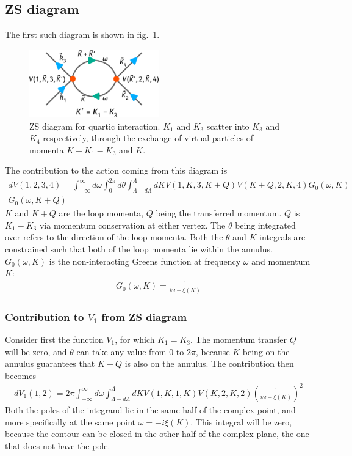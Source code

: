 \documentclass{article}
\begin{document}
\subsection{ZS diagram}
The first such diagram is shown in fig.~\ref{loop11}.
\begin{figure}[!htpb]
\centering
\includegraphics[width=0.5\textwidth]{./figures/term3.pdf}
\caption{ZS diagram for quartic interaction. \(K_1\) and \(K_3\) scatter into \(K_3\) and \(K_4\) respectively, through the exchange of virtual particles of momenta \(K + K_1 - K_3\) and \(K\).}
\label{loop11}
\end{figure}
The contribution to the action coming from this diagram is
\begin{equation}\begin{aligned}
	dV(1,2,3,4) = \int_{-\infty}^\infty d\omega  \int_0^{2\pi} d\theta \int_{\Lambda - d\Lambda}^\Lambda dK V(1,K,3,K+Q) V(K+Q, 2, K, 4) G_0(\omega, K)\\
	G_0(\omega, K+Q)
\end{aligned}\end{equation}
\(K\) and \(K+Q\) are the loop momenta, \(Q\) being the transferred momentum. \(Q\) is \(K_1 - K_3\) via momentum conservation at either vertex. The \(\theta\) being integrated over refers to the direction of the loop momenta. Both the \(\theta\) and \(K\) integrals are constrained such that both of the loop momenta lie within the annulus. \(G_0(\omega,K)\) is the non-interacting Greens function at frequency \(\omega\) and momentum \(K\):
\begin{equation}\begin{aligned}
	G_0(\omega,K) = \frac{1}{i\omega - \xi(K)}
\end{aligned}\end{equation}
\subsubsection{Contribution to \(V_1\) from ZS diagram}
Consider first the function \(V_1\), for which \(K_1=K_3\). The momentum transfer \(Q\) will be zero, and \(\theta\) can take any value from \(0\) to \(2\pi\), because \(K\) being on the annulus guarantees that \(K+Q\) is also on the annulus. The contribution then becomes
\begin{equation}\begin{aligned}
	dV_1(1,2) = 2\pi \int_{-\infty}^\infty d\omega \int_{\Lambda - d\Lambda}^\Lambda dK V(1,K,1,K) V(K, 2, K, 2) \left(\frac{1}{i\omega - \xi(K)}\right)^2
\end{aligned}\end{equation}
Both the poles of the integrand lie in the same half of the complex point, and more specifically at the same point \(\omega = -i\xi(K)\). This integral will be zero, because the contour can be closed in the other half of the complex plane, the one that does not have the pole.
\end{document}
